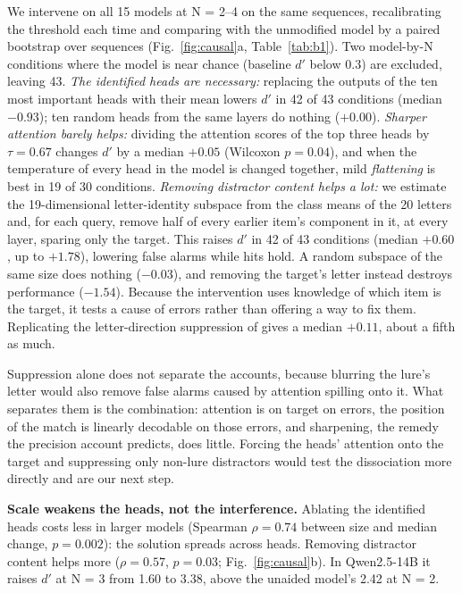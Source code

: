 \documentclass{article}
\newcommand{\dprime}{$d'$}
\begin{document}
We intervene on all 15 models at N = 2--4 on the same sequences, recalibrating the threshold each time and comparing with the unmodified model by a paired bootstrap over sequences (Fig.~\ref{fig:causal}a, Table~\ref{tab:b1}). Two model-by-N conditions where the model is near chance (baseline \dprime{} below 0.3) are excluded, leaving 43. \emph{The identified heads are necessary:} replacing the outputs of the ten most important heads with their mean lowers \dprime{} in 42 of 43 conditions (median $-0.93$); ten random heads from the same layers do nothing ($+0.00$). \emph{Sharper attention barely helps:} dividing the attention scores of the top three heads by $\tau=0.67$ changes \dprime{} by a median $+0.05$ (Wilcoxon $p=0.04$), and when the temperature of every head in the model is changed together, mild \emph{flattening} is best in 19 of 30 conditions. \emph{Removing distractor content helps a lot:} we estimate the 19-dimensional letter-identity subspace from the class means of the 20 letters and, for each query, remove half of every earlier item's component in it, at every layer, sparing only the target. This raises \dprime{} in 42 of 43 conditions (median $+0.60$, up to $+1.78$), lowering false alarms while hits hold. A random subspace of the same size does nothing ($-0.03$), and removing the target's letter instead destroys performance ($-1.54$). Because the intervention uses knowledge of which item is the target, it tests a cause of errors rather than offering a way to fix them. Replicating the letter-direction suppression of \citet{xiong2026superposition} gives a median $+0.11$, about a fifth as much.

Suppression alone does not separate the accounts, because blurring the lure's letter would also remove false alarms caused by attention spilling onto it. What separates them is the combination: attention is on target on errors, the position of the match is linearly decodable on those errors, and sharpening, the remedy the precision account predicts, does little. Forcing the heads' attention onto the target and suppressing only non-lure distractors would test the dissociation more directly and are our next step.

\textbf{Scale weakens the heads, not the interference.} Ablating the identified heads costs less in larger models (Spearman $\rho=0.74$ between size and median change, $p=0.002$): the solution spreads across heads. Removing distractor content helps more ($\rho=0.57$, $p=0.03$; Fig.~\ref{fig:causal}b). In Qwen2.5-14B it raises \dprime{} at N = 3 from 1.60 to 3.38, above the unaided model's 2.42 at N = 2.
\end{document}
